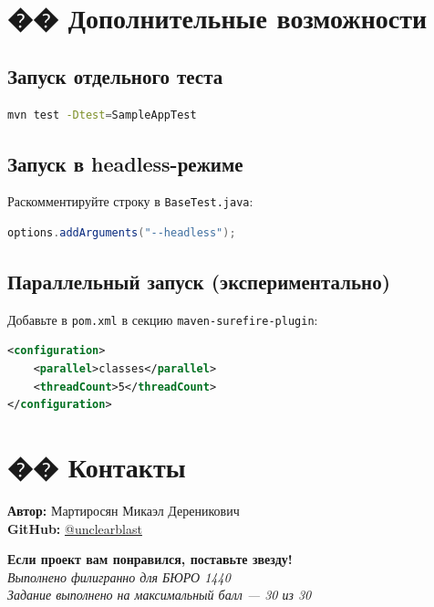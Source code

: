\documentclass[12pt,a4paper]{article}
\begin{document}
\section{�� Дополнительные возможности}

\subsection{Запуск отдельного теста}

\begin{lstlisting}[language=bash]
mvn test -Dtest=SampleAppTest
\end{lstlisting}

\subsection{Запуск в headless-режиме}

Раскомментируйте строку в \texttt{BaseTest.java}:
\begin{lstlisting}[language=java]
options.addArguments("--headless");
\end{lstlisting}

\subsection{Параллельный запуск (экспериментально)}

Добавьте в \texttt{pom.xml} в секцию \texttt{maven-surefire-plugin}:
\begin{lstlisting}[language=xml]
<configuration>
    <parallel>classes</parallel>
    <threadCount>5</threadCount>
</configuration>
\end{lstlisting}

\section{�� Контакты}

\textbf{Автор:} Мартиросян Микаэл Дереникович \\
\textbf{GitHub:} \href{https://github.com/unclearblast}{@unclearblast}

\vspace{1cm}

\begin{center}
\faStar \textbf{Если проект вам понравился, поставьте звезду!} \faStar \\

\vspace{0.5cm}
\textit{Выполнено филигранно для БЮРО 1440} \\
\textit{Задание выполнено на максимальный балл — 30 из 30}
\end{center}
\end{document}
